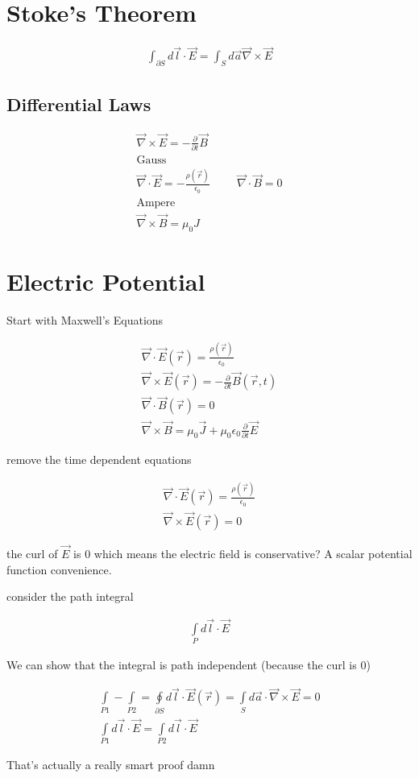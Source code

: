\documentclass[fleqn]{report}
\newcommand{\hp}{\hspace{1cm}}
\newcommand{\del}{\partial}
\newcommand{\equations} [1] {
\begin{gather*}
#1
\end{gather*}
}
\begin{document}
\section{Stoke's Theorem}
\equations{
    \int_{\del S} d \vec l \cdot \vec E = 
    \int_S d \vec a \vec \nabla \times \vec E 
}

\subsection{Differential Laws}
\equations{
    \vec \nabla \times \vec E = - \frac{\del}{\del t} \vec B 
    \\
    \textrm{Gauss}
    \\
    \vec \nabla \cdot \vec E = - \frac{\rho(\vec r)}{\epsilon_0}
    \hp 
    \vec \nabla \cdot \vec B = 0
    \\
    \textrm{Ampere}
    \\
    \vec \nabla \times \vec B = \mu_0 J
}

\section{Electric Potential}
Start with Maxwell's Equations
\equations{
    \vec \nabla \cdot \vec E(\vec r) = \frac{ \rho(\vec r)}{\epsilon_0}
    \\
    \vec \nabla \times \vec E(\vec r) = - \frac{\del}{\del t} \vec B(\vec r, t)
    \\
    \vec \nabla \cdot \vec B(\vec r) = 0
    \\
    \vec \nabla \times \vec B = 
    \mu_0 \vec J + \mu_0 \epsilon_0 \frac{\del}{\del t} \vec E
}
remove the time dependent equations 
\equations{
    \vec \nabla \cdot \vec E(\vec r) = \frac{ \rho(\vec r)}{\epsilon_0}
    \\
    \vec \nabla \times \vec E(\vec r) = 0
}
the curl of $\vec E$ is 0 which means the electric field is conservative? 
A scalar potential function convenience.

consider the path integral 
\equations{
    \int\limits_P d \vec l \cdot \vec E 
}
We can show that the integral is path independent (because the curl is 0)
\equations{
    \int\limits_{P1} - \int\limits_{P2} = 
    \oint\limits_{\del S} d \vec l \cdot \vec E(\vec r)
    =
    \int\limits_S d \vec a \cdot \vec \nabla \times \vec E
    = 0
    \\
    \int\limits_{P1} d \vec l \cdot \vec E = \int\limits_{P2} d \vec l \cdot \vec E
}
That's actually a really smart proof damn 
\end{document}
